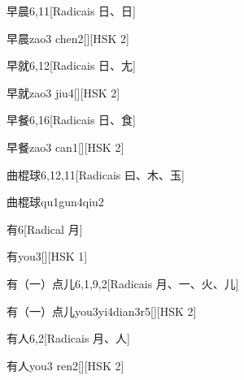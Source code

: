 \begin{entry}{早晨}{6,11}[Radicais ⽇、⽇]
  \begin{phonetics}{早晨}{zao3 chen2}[][HSK 2]
  \end{phonetics}
\end{entry}

\begin{entry}{早就}{6,12}[Radicais ⽇、⼪]
  \begin{phonetics}{早就}{zao3 jiu4}[][HSK 2]
  \end{phonetics}
\end{entry}

\begin{entry}{早餐}{6,16}[Radicais ⽇、⾷]
  \begin{phonetics}{早餐}{zao3 can1}[][HSK 2]
  \end{phonetics}
\end{entry}

\begin{entry}{曲棍球}{6,12,11}[Radicais ⽈、⽊、⽟]
  \begin{phonetics}{曲棍球}{qu1gun4qiu2}
  \end{phonetics}
\end{entry}

\begin{entry}{有}{6}[Radical ⽉]
  \begin{phonetics}{有}{you3}[][HSK 1]
  \end{phonetics}
\end{entry}

\begin{entry}{有（一）点儿}{6,1,9,2}[Radicais ⽉、⼀、⽕、⼉]
  \begin{phonetics}{有（一）点儿}{you3yi4dian3r5}[][HSK 2]
  \end{phonetics}
\end{entry}

\begin{entry}{有人}{6,2}[Radicais ⽉、⼈]
  \begin{phonetics}{有人}{you3 ren2}[][HSK 2]
  \end{phonetics}
\end{entry}

